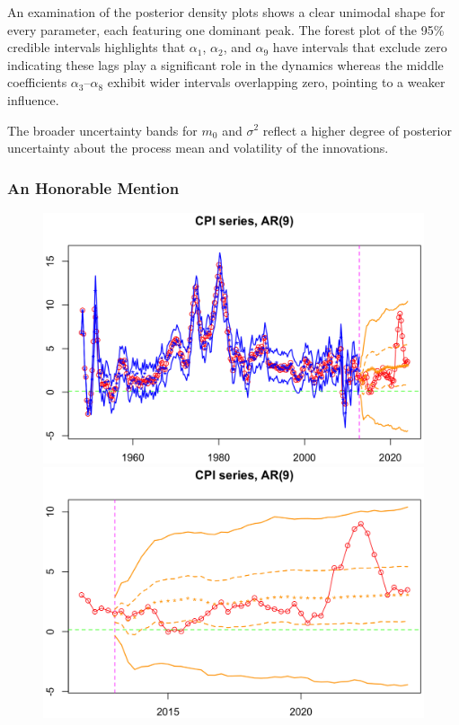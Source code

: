 \documentclass{Configuration_Files/PoliMi3i_thesis}
\begin{document}
An examination of the posterior density plots shows a clear unimodal shape for every parameter, each featuring one dominant peak. The forest plot of the 95\% credible intervals highlights that \(\alpha_1\), \(\alpha_2\), and \(\alpha_9\) have intervals that exclude zero indicating these lags play a significant role in the dynamics whereas the middle coefficients \(\alpha_3\)–\(\alpha_8\) exhibit wider intervals overlapping zero, pointing to a weaker influence. 

The broader uncertainty bands for \(m_0\) and \(\sigma^2\) reflect a higher degree of posterior uncertainty about the process mean and volatility of the innovations.

\subsubsection{An Honorable Mention}
\begin{figure}[H]
    \centering
    \begin{minipage}[t]{0.49\textwidth}
        \centering
        \includegraphics[width=\linewidth]{AR(9)_HM1.png}
    \end{minipage}
    \hfill
    \begin{minipage}[t]{0.49\textwidth}
        \centering
        \includegraphics[width=\linewidth]{AR(9)_HM2.png}
    \end{minipage}
\end{figure}
\end{document}
